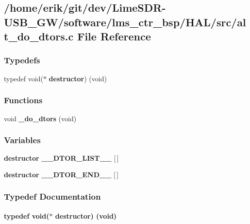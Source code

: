 \subsection{/home/erik/git/dev/\+Lime\+S\+D\+R-\/\+U\+S\+B\+\_\+\+G\+W/software/lms\+\_\+ctr\+\_\+bsp/\+H\+A\+L/src/alt\+\_\+do\+\_\+dtors.c File Reference}
\label{alt__do__dtors_8c}
\subsubsection*{Typedefs}
\begin{DoxyCompactItemize}
\item 
typedef void($\ast$ {\bf destructor}) (void)
\end{DoxyCompactItemize}
\subsubsection*{Functions}
\begin{DoxyCompactItemize}
\item 
void {\bf \+\_\+do\+\_\+dtors} (void)
\end{DoxyCompactItemize}
\subsubsection*{Variables}
\begin{DoxyCompactItemize}
\item 
{\bf destructor} {\bf \+\_\+\+\_\+\+D\+T\+O\+R\+\_\+\+L\+I\+S\+T\+\_\+\+\_\+} [$\,$]
\item 
{\bf destructor} {\bf \+\_\+\+\_\+\+D\+T\+O\+R\+\_\+\+E\+N\+D\+\_\+\+\_\+} [$\,$]
\end{DoxyCompactItemize}


\subsubsection{Typedef Documentation}
\paragraph[{destructor}]{\setlength{\rightskip}{0pt plus 5cm}typedef void($\ast$ destructor) (void)}\label{alt__do__dtors_8c_a140a24a0d9327ee229ab56eabb676ac3}


